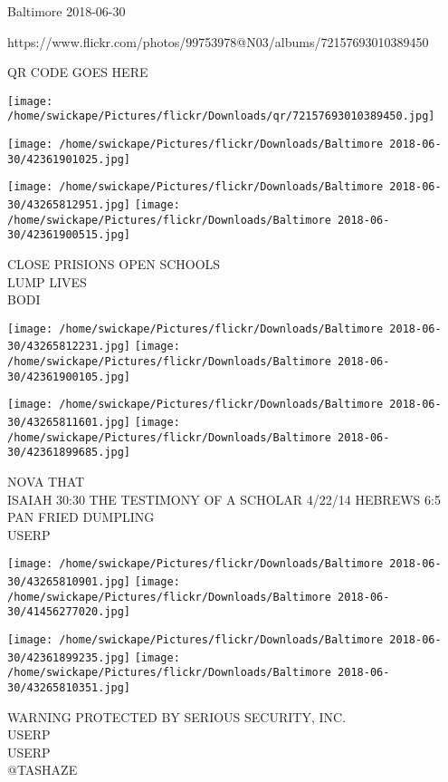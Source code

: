 \documentclass[10pt,letterpaper]{article}
\begin{document}
Baltimore 2018-06-30

https://www.flickr.com/photos/99753978@N03/albums/72157693010389450

QR CODE GOES HERE

\texttt{[image: /home/swickape/Pictures/flickr/Downloads/qr/72157693010389450.jpg]}
\pagebreak

\texttt{[image: /home/swickape/Pictures/flickr/Downloads/Baltimore 2018-06-30/42361901025.jpg]}

\vspace{0.25in}
\texttt{[image: /home/swickape/Pictures/flickr/Downloads/Baltimore 2018-06-30/43265812951.jpg]}
\texttt{[image: /home/swickape/Pictures/flickr/Downloads/Baltimore 2018-06-30/42361900515.jpg]}

CLOSE PRISIONS OPEN SCHOOLS\\
LUMP LIVES\\
BODI\\
\pagebreak

\texttt{[image: /home/swickape/Pictures/flickr/Downloads/Baltimore 2018-06-30/43265812231.jpg]}
\texttt{[image: /home/swickape/Pictures/flickr/Downloads/Baltimore 2018-06-30/42361900105.jpg]}

\texttt{[image: /home/swickape/Pictures/flickr/Downloads/Baltimore 2018-06-30/43265811601.jpg]}
\texttt{[image: /home/swickape/Pictures/flickr/Downloads/Baltimore 2018-06-30/42361899685.jpg]}

NOVA THAT\\
ISAIAH 30:30 THE TESTIMONY OF A SCHOLAR 4/22/14 HEBREWS 6:5\\
PAN FRIED DUMPLING\\
USERP\\
\pagebreak

\texttt{[image: /home/swickape/Pictures/flickr/Downloads/Baltimore 2018-06-30/43265810901.jpg]}
\texttt{[image: /home/swickape/Pictures/flickr/Downloads/Baltimore 2018-06-30/41456277020.jpg]}

\texttt{[image: /home/swickape/Pictures/flickr/Downloads/Baltimore 2018-06-30/42361899235.jpg]}
\texttt{[image: /home/swickape/Pictures/flickr/Downloads/Baltimore 2018-06-30/43265810351.jpg]}

WARNING PROTECTED BY SERIOUS SECURITY, INC.\\
USERP\\
USERP\\
@TASHAZE\\
\pagebreak
\end{document}
